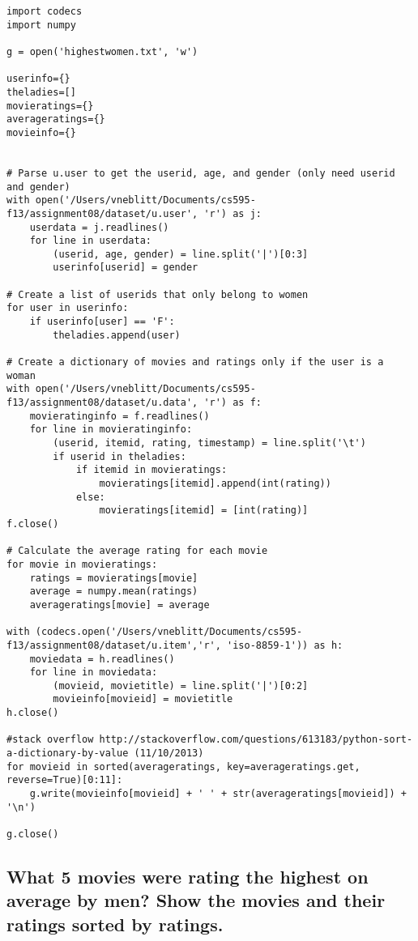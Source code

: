 \documentclass{article}
\begin{document}
\begin{lstlisting}[frame=single, caption=highestwomen.py, label=highwomen]
import codecs
import numpy

g = open('highestwomen.txt', 'w')

userinfo={}
theladies=[]
movieratings={}
averageratings={}
movieinfo={}


# Parse u.user to get the userid, age, and gender (only need userid and gender)
with open('/Users/vneblitt/Documents/cs595-f13/assignment08/dataset/u.user', 'r') as j:
	userdata = j.readlines()
	for line in userdata:
		(userid, age, gender) = line.split('|')[0:3]
		userinfo[userid] = gender

# Create a list of userids that only belong to women
for user in userinfo:
	if userinfo[user] == 'F':
		theladies.append(user)

# Create a dictionary of movies and ratings only if the user is a woman
with open('/Users/vneblitt/Documents/cs595-f13/assignment08/dataset/u.data', 'r') as f:
	movieratinginfo = f.readlines()
	for line in movieratinginfo:
		(userid, itemid, rating, timestamp) = line.split('\t')
		if userid in theladies:
			if itemid in movieratings:
				movieratings[itemid].append(int(rating))
			else:
				movieratings[itemid] = [int(rating)]
f.close()

# Calculate the average rating for each movie
for movie in movieratings:
	ratings = movieratings[movie]
	average = numpy.mean(ratings)
	averageratings[movie] = average

with (codecs.open('/Users/vneblitt/Documents/cs595-f13/assignment08/dataset/u.item','r', 'iso-8859-1')) as h:
	moviedata = h.readlines()
	for line in moviedata:
		(movieid, movietitle) = line.split('|')[0:2]
		movieinfo[movieid] = movietitle
h.close()

#stack overflow http://stackoverflow.com/questions/613183/python-sort-a-dictionary-by-value (11/10/2013)
for movieid in sorted(averageratings, key=averageratings.get, reverse=True)[0:11]:
	g.write(movieinfo[movieid] + ' ' + str(averageratings[movieid]) + '\n')

g.close()
\end{lstlisting}

\newpage
\subsection{What 5 movies were rating the highest on average by men? Show the movies and their ratings sorted by ratings.}
\end{document}
